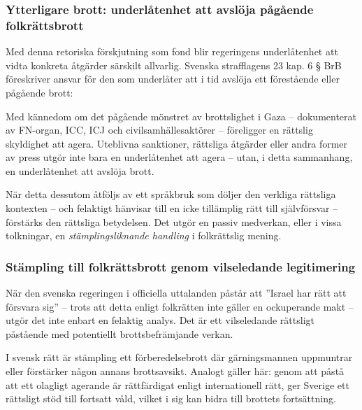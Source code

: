 \subsubsection{Ytterligare brott: underlåtenhet att avslöja pågående folkrättsbrott}

Med denna retoriska förskjutning som fond blir regeringens underlåtenhet att vidta konkreta åtgärder särskilt allvarlig. 
Svenska strafflagens 23 kap. 6 § BrB föreskriver ansvar för den som underlåter att i tid avslöja ett förestående eller pågående brott:


Med kännedom om det pågående mönstret av brottslighet i Gaza – dokumenterat av FN-organ, ICC, ICJ och civilsamhällesaktörer – 
föreligger en rättslig skyldighet att agera. Uteblivna sanktioner, rättsliga åtgärder eller andra former av press utgör inte 
bara en underlåtenhet att agera – utan, i detta sammanhang, en underlåtenhet att avslöja brott.

När detta dessutom åtföljs av ett språkbruk som döljer den verkliga rättsliga kontexten – och felaktigt hänvisar 
till en icke tillämplig rätt till självförsvar – förstärks den rättsliga betydelsen. 
Det utgör en passiv medverkan, eller i vissa tolkningar, en \textit{stämplingsliknande handling} i folkrättslig mening.

\medskip

\subsubsection{Stämpling till folkrättsbrott genom vilseledande legitimering}

När den svenska regeringen i officiella uttalanden påstår att ”Israel har rätt att försvara sig” – trots att detta 
enligt folkrätten inte gäller en ockuperande makt – utgör det inte enbart en felaktig analys. 
Det är ett vilseledande rättsligt påstående med potentiellt brottsbefrämjande verkan.

I svensk rätt är stämpling ett förberedelsebrott där gärningsmannen uppmuntrar eller förstärker någon annans brottsavsikt. 
Analogt gäller här: genom att påstå att ett olagligt agerande är rättfärdigat enligt internationell rätt, 
ger Sverige ett rättsligt stöd till fortsatt våld, vilket i sig kan bidra till brottets fortsättning.

